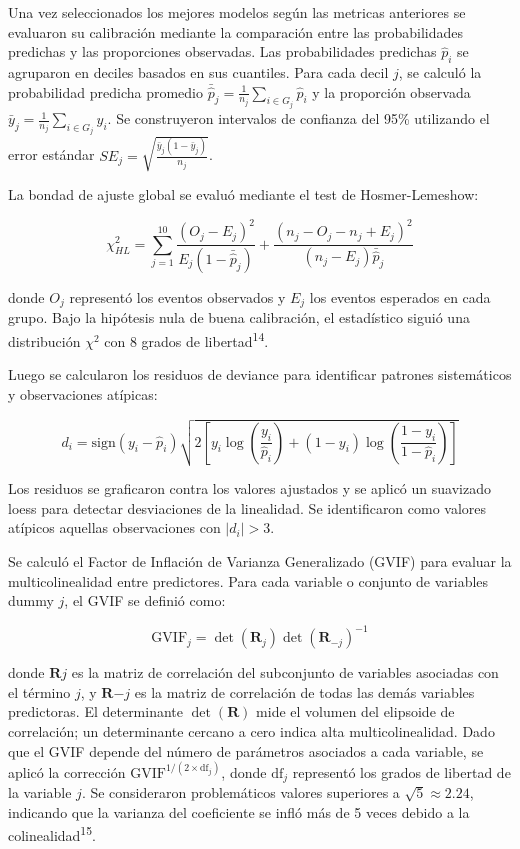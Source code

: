 \documentclass[
  spanish,
  10pt,
]{article}
\begin{document}
Una vez seleccionados los mejores modelos según las metricas anteriores
se evaluaron su calibración mediante la comparación entre las
probabilidades predichas y las proporciones observadas. Las
probabilidades predichas \(\hat{p}_i\) se agruparon en deciles basados
en sus cuantiles. Para cada decil \(j\), se calculó la probabilidad
predicha promedio
\(\bar{\hat{p}}_j = \frac{1}{n_j}\sum_{i \in G_j} \hat{p}_i\) y la
proporción observada \(\bar{y}_j = \frac{1}{n_j}\sum_{i \in G_j} y_i\).
Se construyeron intervalos de confianza del 95\% utilizando el error
estándar \(SE_j = \sqrt{\frac{\bar{y}_j(1-\bar{y}_j)}{n_j}}\).

La bondad de ajuste global se evaluó mediante el test de
Hosmer-Lemeshow:

\[\chi^2_{HL} = \sum_{j=1}^{10} \frac{(O_j - E_j)^2}{E_j(1 - \bar{\hat{p}}_j)} + \frac{(n_j - O_j - n_j + E_j)^2}{(n_j - E_j)\bar{\hat{p}}_j}\]

donde \(O_j\) representó los eventos observados y \(E_j\) los eventos
esperados en cada grupo. Bajo la hipótesis nula de buena calibración, el
estadístico siguió una distribución \(\chi^2\) con 8 grados de
libertad\textsuperscript{14}.

Luego se calcularon los residuos de deviance para identificar patrones
sistemáticos y observaciones atípicas:

\[d_i = \text{sign}(y_i - \hat{p}_i) \sqrt{2\left[y_i \log\left(\frac{y_i}{\hat{p}_i}\right) + (1-y_i)\log\left(\frac{1-y_i}{1-\hat{p}_i}\right)\right]}\]

Los residuos se graficaron contra los valores ajustados y se aplicó un
suavizado loess para detectar desviaciones de la linealidad. Se
identificaron como valores atípicos aquellas observaciones con
\(|d_i| > 3\).

Se calculó el Factor de Inflación de Varianza Generalizado (GVIF) para
evaluar la multicolinealidad entre predictores. Para cada variable o
conjunto de variables dummy \(j\), el GVIF se definió como:

\[\text{GVIF}_j = \det(\mathbf{R}_j)\det(\mathbf{R}_{-j})^{-1}\]

donde \(\mathbf{R}j\) es la matriz de correlación del subconjunto de
variables asociadas con el término \(j\), y \(\mathbf{R}{-j}\) es la
matriz de correlación de todas las demás variables predictoras. El
determinante \(\det(\mathbf{R})\) mide el volumen del elipsoide de
correlación; un determinante cercano a cero indica alta
multicolinealidad. Dado que el GVIF depende del número de parámetros
asociados a cada variable, se aplicó la corrección
\(\text{GVIF}^{1/(2 \times \text{df}_j)}\), donde \(\text{df}_j\)
representó los grados de libertad de la variable \(j\). Se consideraron
problemáticos valores superiores a \(\sqrt{5} \approx 2.24\), indicando
que la varianza del coeficiente se infló más de 5 veces debido a la
colinealidad\textsuperscript{15}.
\end{document}
